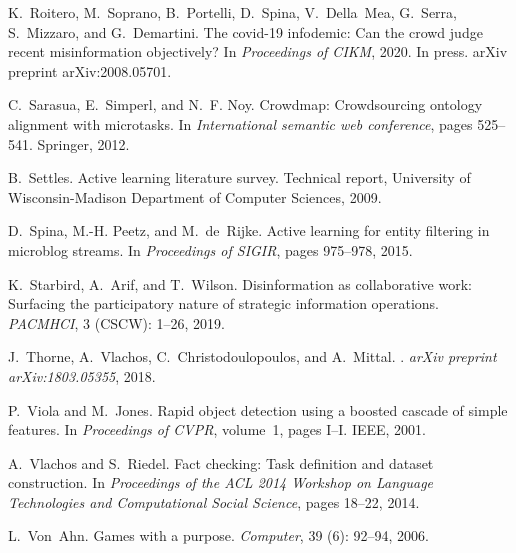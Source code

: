 \documentclass[11pt]{article}
\begin{document}
\begin{thebibliography}{10}
\begin{small}
K.~Roitero, M.~Soprano, B.~Portelli, D.~Spina, V.~Della~Mea, G.~Serra,
S.~Mizzaro, and G.~Demartini.
\newblock The covid-19 infodemic: Can the crowd judge recent misinformation
objectively?
\newblock In \emph{Proceedings of CIKM}, 2020{}.
\newblock In press. arXiv preprint arXiv:2008.05701.

C.~Sarasua, E.~Simperl, and N.~F. Noy.
\newblock Crowdmap: Crowdsourcing ontology alignment with microtasks.
\newblock In \emph{International semantic web conference}, pages 525--541.
Springer, 2012.

B.~Settles.
\newblock Active learning literature survey.
\newblock Technical report, University of Wisconsin-Madison Department of
Computer Sciences, 2009.

D.~Spina, M.-H. Peetz, and M.~de~Rijke.
\newblock Active learning for entity filtering in microblog streams.
\newblock In \emph{Proceedings of SIGIR}, pages 975--978, 2015.

K.~Starbird, A.~Arif, and T.~Wilson.
\newblock Disinformation as collaborative work: Surfacing the participatory
nature of strategic information operations.
\newblock \emph{PACMHCI}, 3 (CSCW): 1--26, 2019.

J.~Thorne, A.~Vlachos, C.~Christodoulopoulos, and A.~Mittal.
.
\newblock \emph{arXiv preprint arXiv:1803.05355}, 2018.

P.~Viola and M.~Jones.
\newblock Rapid object detection using a boosted cascade of simple features.
\newblock In \emph{Proceedings of CVPR}, volume~1, pages I--I. IEEE, 2001.

A.~Vlachos and S.~Riedel.
\newblock Fact checking: Task definition and dataset construction.
\newblock In \emph{Proceedings of the ACL 2014 Workshop on Language
	Technologies and Computational Social Science}, pages 18--22, 2014.

L.~Von~Ahn.
\newblock Games with a purpose.
\newblock \emph{Computer}, 39 (6): 92--94, 2006.


\end{small}
\end{thebibliography}
\end{document}
